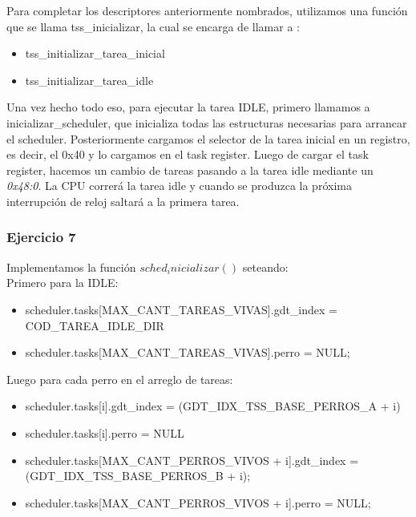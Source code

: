\indent Para completar los descriptores anteriormente nombrados, utilizamos una funci\'on que se llama tss\_inicializar, la cual se encarga de llamar a :\\
\begin{itemize}
	\item tss\_initializar\_tarea\_inicial
	\item tss\_initializar\_tarea\_idle
\end{itemize}

\indent Una vez hecho todo eso, para ejecutar la tarea IDLE, primero llamamos a inicializar\_scheduler, que inicializa todas las estructuras necesarias para arrancar el scheduler. Posteriormente cargamos el selector de la tarea inicial en un registro, es decir, el 0x40 y lo cargamos en el task register. Luego de cargar el task register, hacemos un cambio de tareas pasando a la tarea idle mediante un \emph{0x48:0}. La CPU correr\'a la tarea idle y cuando se produzca la pr\'oxima interrupci\'on de reloj saltar\'a a la primera tarea. \\


\subsubsection{Ejercicio 7}

\indent Implementamos la funci\'on $sched_inicializar()$ seteando:\\

Primero para la IDLE:\\
\begin{itemize}
	\item scheduler.tasks[MAX_CANT_TAREAS_VIVAS].gdt_index = COD_TAREA_IDLE_DIR
	\item scheduler.tasks[MAX_CANT_TAREAS_VIVAS].perro = NULL;
\end{itemize}

Luego para cada perro en el arreglo de tareas: \\

\begin{itemize}
	\item scheduler.tasks[i].gdt_index = (GDT_IDX_TSS_BASE_PERROS_A + i)
	\item scheduler.tasks[i].perro = NULL
	\item scheduler.tasks[MAX_CANT_PERROS_VIVOS + i].gdt_index = (GDT_IDX_TSS_BASE_PERROS_B + i);
	\item scheduler.tasks[MAX_CANT_PERROS_VIVOS + i].perro = NULL;
\end{itemize}

